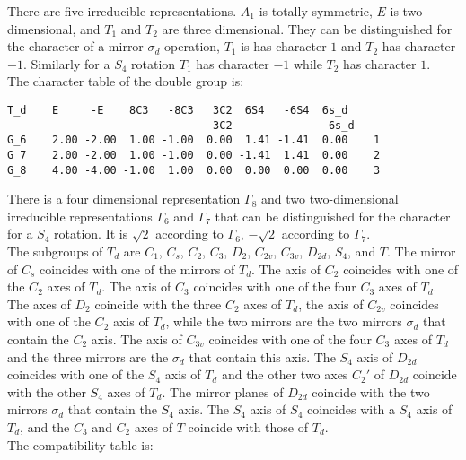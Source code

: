 \documentclass[12pt,a4paper,twoside]{report}
\begin{document}
There are five irreducible representations. $A_1$ is totally symmetric,
$E$ is two dimensional, and $T_1$ and $T_2$ are three dimensional.
They can be distinguished for the character of a mirror $\sigma_d$ operation,
$T_1$ is has character $1$ and $T_2$ has character $-1$. 
Similarly for a $S_4$ rotation $T_1$ has character $-1$ 
while $T_2$ has character $1$. \\
The character table of the double group is:

\begin{tcolorbox}
\begin{footnotesize}
\begin{verbatim}
T_d    E     -E    8C3   -8C3   3C2  6S4   -6S4  6s_d 
                               -3C2              -6s_d
G_6    2.00 -2.00  1.00 -1.00  0.00  1.41 -1.41  0.00    1
G_7    2.00 -2.00  1.00 -1.00  0.00 -1.41  1.41  0.00    2
G_8    4.00 -4.00 -1.00  1.00  0.00  0.00  0.00  0.00    3
\end{verbatim}
\end{footnotesize}
\end{tcolorbox}

There is a four dimensional representation $\Gamma_8$ and two two-dimensional 
irreducible representations $\Gamma_6$ and $\Gamma_7$ that can be
distinguished for the character for a $S_4$ rotation. It is $\sqrt{2}$
according to $\Gamma_6$, $-\sqrt{2}$ according to $\Gamma_7$. \\
The subgroups of $T_d$ are $C_1$, $C_s$, $C_2$, $C_3$, $D_2$, $C_{2v}$,
$C_{3v}$, $D_{2d}$, $S_4$, and $T$. The mirror of $C_s$ coincides with one
of the mirrors of $T_d$. The axis of $C_2$ coincides with one of the $C_2$
axes of $T_d$. The axis of $C_3$ coincides with one of the four $C_3$
axes of $T_d$. The axes of $D_2$ coincide with the three $C_2$ axes of
$T_d$, the axis of $C_{2v}$ coincides with one of the $C_2$ axis of 
$T_d$, while the two mirrors are the two mirrors $\sigma_d$ that contain
the $C_2$ axis. The axis of $C_{3v}$ coincides with one of the four
$C_3$ axes of $T_d$ and the three mirrors are the $\sigma_d$ that 
contain this axis. The $S_4$ axis of $D_{2d}$ coincides with one of
the $S_4$ axis of $T_d$ and the other two axes $C_2'$ of $D_{2d}$ coincide with the 
other $S_4$ axes of $T_d$. The mirror planes of $D_{2d}$ coincide with the two
mirrors $\sigma_d$ that contain the $S_4$ axis. The $S_4$ axis of $S_4$ 
coincides with a $S_4$ axis of $T_d$, and the $C_3$ and $C_2$ axes of $T$ 
coincide with those of $T_d$. \\
The compatibility table is:
\end{document}
